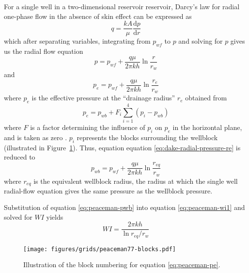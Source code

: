 For a single well in a two-dimensional reservoir reservoir, Darcy's law for radial one-phase flow in the absence of skin effect can be expressed as
\begin{equation}
    q = \frac{kA}{\mu} \frac{\mathrm{d}p}{\mathrm{d}r}
\end{equation}
which after separating variables, integrating from $p_{wf}$ to $p$ and solving for $p$ gives us the radial flow equation
\begin{equation}
    \label{eq:dake-radial-pressure}
    p = p_{wf} + \frac{q\mu}{2\pi kh} \ln{\frac{r}{r_w}}
\end{equation}
and
\begin{equation}
    \label{eq:dake-radial-pressure-re}
    p_e = p_{wf} + \frac{q\mu}{2\pi kh} \ln{\frac{r_e}{r_w}}
\end{equation}
where $p_e$ is the effective pressure at the ``drainage radius'' $r_e$ \cite{Dake1978Developments} obtained from
\begin{equation}
    \label{eq:peaceman-pe}
    p_e = p_{wb} + F_i \sum_{i=1}^{4}\left( p_i - p_{wb} \right)
\end{equation}
where $F$ is a factor determining the influence of $p_i$ on $p_e$ in the horizontal plane, and is taken as zero \cite{Schwabe1967Prediction,Peaceman1978Interpretation}. $p_i$ represents the blocks surrounding the wellblock (illustrated in Figure~\ref{fig:peaceman-block-numbering}). Thus, equation equation \eqref{eq:dake-radial-pressure-re} is reduced to
\begin{equation}
    \label{eq:peaceman-pwb}
    p_{wb} = p_{wf} + \frac{q\mu}{2\pi kh} \ln{\frac{r_{eq}}{r_w}}
\end{equation}
where $r_{eq}$ is the equivalent wellblock radius, the radius at which the single well radial-flow equation gives the same pressure as the wellblock pressure\cite{Peaceman1978Interpretation,Peaceman2003New}.

Substitution of equation \eqref{eq:peaceman-pwb} into equation \eqref{eq:peaceman-wi1} and solved for $WI$ yields
\begin{equation}
    \label{eq:peaceman-wi2}
    WI = \frac{2\pi kh}{\ln{r_{eq}/r_w}}
\end{equation}

\begin{figure}[htbp]
    \centering
    \texttt{[image: figures/grids/peaceman77-blocks.pdf]}
    \caption{Illustration of the block numbering for equation \eqref{eq:peaceman-pe}.}
    \label{fig:peaceman-block-numbering}
\end{figure}





